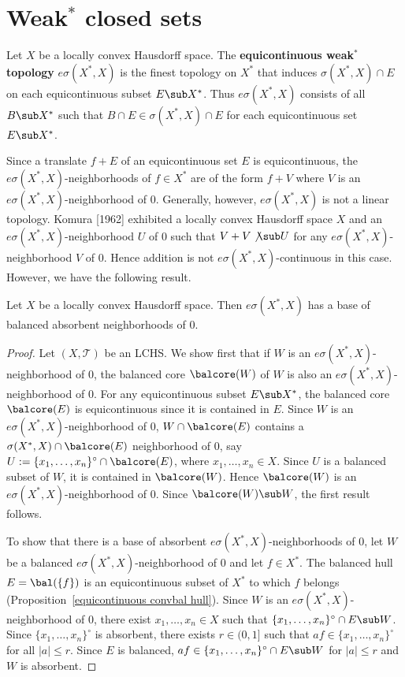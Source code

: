 \section{Weak$^*$ closed sets}
\begin{definition}
Let $X$ be a locally convex Hausdorff space. The \textbf{equicontinuous weak$^*$ topology} $e\sigma(X^*,X)$ is the finest topology on $X^*$ that induces $\sigma(X^*,X)\cap E$ on each equicontinuous subset $E\sub X^*$. Thus $e\sigma(X^*,X)$ consists of all $B\sub X^*$ such that $B\cap E\in\sigma(X^*,X)\cap E$ for each equicontinuous set $E\sub X^*$.
\end{definition}
Since a translate $f+E$ of an equicontinuous set $E$ is equicontinuous, the $e\sigma(X^*,X)$-neighborhoods of $f\in X^*$ are of the form $f+V$ where $V$ is an $e\sigma(X^*,X)$-neighborhood of $0$. Generally, however, $e\sigma(X^*,X)$ is not a linear topology. Komura [1962] exhibited a locally convex Hausdorff space $X$ and an $e\sigma(X^*,X)$-neighborhood $U$ of $0$ such that $V+V\not\sub U$ for any $e\sigma(X^*,X)$-neighborhood $V$ of $0$. Hence addition is not $e\sigma(X^*,X)$-continuous in this case. However, we have the following result.
\begin{proposition}\label{LCHS esigma topo bal absorbent nbhd}
Let $X$ be a locally convex Hausdorff space. Then $e\sigma(X^*,X)$ has a base of balanced absorbent neighborhoods of $0$.
\end{proposition}
\begin{proof}
Let $(X,\mathcal{T})$ be an LCHS. We show first that if $W$ is an $e\sigma(X^*,X)$-neighborhood of $0$, the balanced core $\balcore(W)$ of $W$ is also an $e\sigma(X^*,X)$-neighborhood of $0$. For any equicontinuous subset $E\sub X^*$, the balanced core $\balcore(E)$ is equicontinuous since it is contained in $E$. Since $W$ is an $e\sigma(X^*,X)$-neighborhood of $0$, $W\cap\balcore(E)$ contains a $\sigma(X^*,X)\cap\balcore(E)$ neighborhood of $0$, say $U:=\{x_1,\dots,x_n\}^\circ\cap\balcore(E)$, where $x_1,\dots,x_n\in X$. Since $U$ is a balanced subset of $W$, it is contained in $\balcore(W)$. Hence $\balcore(W)$ is an $e\sigma(X^*,X)$-neighborhood of $0$. Since $\balcore(W)\sub W$, the first result follows.\par
To show that there is a base of absorbent $e\sigma(X^*,X)$-neighborhoods of $0$, let $W$ be a balanced $e\sigma(X^*,X)$-neighborhood of $0$ and let $f\in X^*$. The balanced hull $E=\bal(\{f\})$ is an equicontinuous subset of $X^*$ to which $f$ belongs (Proposition~\ref{equicontinuous convbal hull}). Since $W$ is an $e\sigma(X^*,X)$-neighborhood of $0$, there exist $x_1,\dots,x_n\in X$ such that $\{x_1,\dots,x_n\}^\circ\cap E\sub W$. Since $\{x_1,\dots,x_n\}^\circ$ is absorbent, there exists $r\in(0,1]$ such that $af\in\{x_1,\dots,x_n\}^\circ$ for all $|a|\leq r$. Since $E$ is balanced, $af\in\{x_1,\dots,x_n\}^\circ\cap E\sub W$ for $|a|\leq r$ and $W$ is absorbent.
\end{proof}
